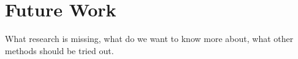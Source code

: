 \chapter{Future Work}
{\color{red}What research is missing, what do we want to know more about, what other methods should be tried out.}
